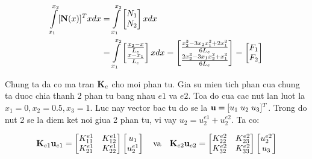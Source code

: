 \begin{equation}
    \begin{aligned}
        \int\limits_{x_1}^{x_2} [{\bf N}(x)]^Tx dx &= \int\limits_{x_1}^{x_2} \begin{bmatrix}
            N_1 \\ N_2
        \end{bmatrix}x dx \\
        & = \int\limits_{x_1}^{x_2}\begin{bmatrix}
            \frac{x_2-x}{L_e} \\ \frac{x-x_1}{L_e}
        \end{bmatrix}x dx = \begin{bmatrix}
            \frac{x_2^3-3x_2x_1^2+2x_1^3}{6L_e} \\ \frac{2x_2^3-3x_1x_2^2+x_1^3}{6L_e}
        \end{bmatrix} = \begin{bmatrix}
            F_1 \\ F_2
        \end{bmatrix}
    \end{aligned}
\end{equation}

Chung ta da co ma tran ${\bf K}_e$ cho moi phan tu. Gia su mien tich phan cua chung ta duoc chia thanh 2 phan tu bang nhau $e1$ va $e2$. Toa do cua cac nut lan luot la $x_1 = 0, x_2 = 0.5, x_3 = 1$. Luc nay vector bac tu do se la ${\bf u} = [u_1 \; u_2 \; u_3]^T$. Trong do nut 2 se la diem ket noi giua 2 phan tu, vi vay $u_2 = u_2^{e1} + u_2^{e2}$. Ta co:

\begin{equation}
    {\bf K}_{e1}{\bf u}_{e1} = \begin{bmatrix}
        K_{11}^{e1} & K_{12}^{e1} \\
        K_{21}^{e1} & K_{22}^{e1}
    \end{bmatrix}\begin{bmatrix}
        u_1 \\ u_2^{e1}
    \end{bmatrix} \quad \hbox{va} \quad {\bf K}_{e2}{\bf u}_{e2} = \begin{bmatrix}
        K_{22}^{e2} & K_{23}^{e2} \\
        K_{32}^{e2} & K_{33}^{e2}
    \end{bmatrix}\begin{bmatrix}
        u_2^{e2} \\ u_3
    \end{bmatrix}
\end{equation}

